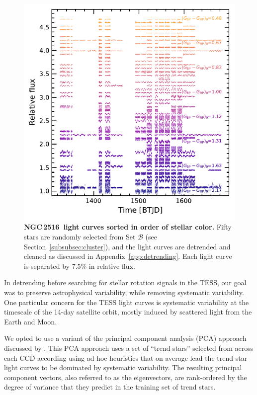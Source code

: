 \documentclass[12pt,twocolumn,tighten]{aastex63}
\newcommand{\cn}{NGC\,2516} %
\begin{document}
\begin{figure}[t]
	\begin{center}
		\leavevmode
		\includegraphics[width=\textwidth]{f14.pdf}
	\end{center}
	\vspace{-1cm}
  \caption{ {\bf \cn\ light curves sorted in order
  of stellar color.} Fifty stars are randomly selected from Set
  $\mathcal{B}$ (see Section~\ref{subsubsec:cluster}), and the light
  curves are detrended and cleaned as discussed in
  Appendix~\ref{app:detrending}.  Each light curve is separated by
  7.5\% in relative flux.  \label{fig:lightcurves}
	}
\end{figure}



In detrending before searching for stellar rotation signals in the
TESS, our goal was to preserve astrophysical variability, while
removing systematic variability.  One particular concern for the TESS
light curves is systematic variability at the timescale of the 14-day
satellite orbit, mostly induced by scattered light from the Earth and
Moon.

We opted to use a variant of the principal component analysis (PCA)
approach discussed by \citet{bouma_cdipsI_2019}. This PCA approach
uses a set of ``trend stars'' selected from across each CCD according
using ad-hoc heuristics that on average lead the trend star light
curves to be dominated by systematic variability.  The resulting
principal component vectors, also referred to as the eigenvectors, are
rank-ordered by the degree of variance that they predict in the
training set of trend stars.
\end{document}
